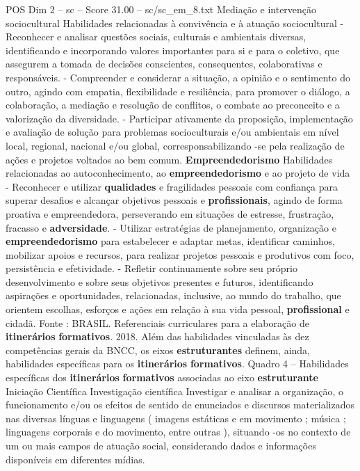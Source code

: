 \begin{textsample}{POS Dim 2 – sc – Score 31.00 – sc/sc\_em\_8.txt}
Mediação e intervenção sociocultural Habilidades relacionadas à convivência e à atuação sociocultural - Reconhecer e analisar questões sociais, culturais e ambientais diversas, identificando e incorporando valores importantes para si e para o coletivo, que assegurem a tomada de decisões conscientes, consequentes, colaborativas e responsáveis. - Compreender e considerar a situação, a opinião e o sentimento do outro, agindo com empatia, flexibilidade e resiliência, para promover o diálogo, a colaboração, a mediação e resolução de conflitos, o combate ao preconceito e a valorização da diversidade. - Participar ativamente da proposição, implementação e avaliação de solução para problemas socioculturais e/ou ambientais em nível local, regional, nacional e/ou global, corresponsabilizando -se pela realização de ações e projetos voltados ao bem comum. \textbf{Empreendedorismo} Habilidades relacionadas ao autoconhecimento, ao \textbf{empreendedorismo} e ao projeto de vida - Reconhecer e utilizar \textbf{qualidades} e fragilidades pessoais com confiança para superar desafios e alcançar objetivos pessoais e \textbf{profissionais}, agindo de forma proativa e empreendedora, perseverando em situações de estresse, frustração, fracasso e \textbf{adversidade}. - Utilizar estratégias de planejamento, organização e \textbf{empreendedorismo} para estabelecer e adaptar metas, identificar caminhos, mobilizar apoios e recursos, para realizar projetos pessoais e produtivos com foco, persistência e efetividade. - Refletir continuamente sobre seu próprio desenvolvimento e sobre seus objetivos presentes e futuros, identificando aspirações e oportunidades, relacionadas, inclusive, ao mundo do trabalho, que orientem escolhas, esforços e ações em relação à sua vida pessoal, \textbf{profissional} e cidadã.
Fonte : BRASIL.
Referenciais curriculares para a elaboração de \textbf{itinerários} \textbf{formativos}. 2018.
Além das habilidades vinculadas às dez competências gerais da BNCC, os eixos \textbf{estruturantes} definem, ainda, habilidades específicas para os \textbf{itinerários} \textbf{formativos}.
Quadro 4 – Habilidades específicas dos \textbf{itinerários} \textbf{formativos} associadas ao eixo \textbf{estruturante} Iniciação Científica Investigação científica Investigar e analisar a organização, o funcionamento e/ou os efeitos de sentido de enunciados e discursos materializados nas diversas línguas e linguagens ( imagens estáticas e em movimento ; música ; linguagens corporais e do movimento, entre outras ), situando -os no contexto de um ou mais campos de atuação social, considerando dados e informações disponíveis em diferentes mídias.

\end{textsample}
